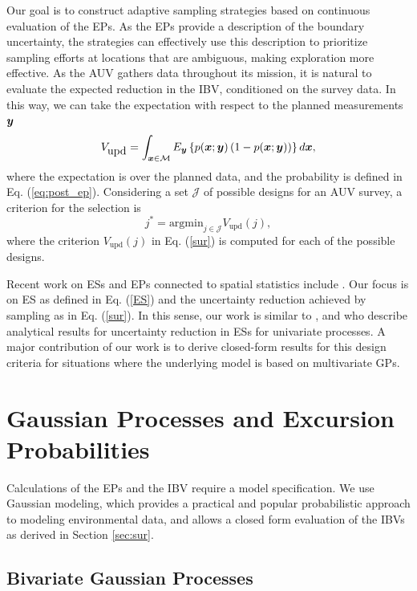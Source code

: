 \documentclass[aoas]{imsart}
\begin{document}
Our goal is to construct adaptive sampling strategies based on continuous evaluation of the EPs. As the EPs provide a description of the boundary uncertainty, the strategies can effectively use this description to prioritize sampling efforts at locations that are ambiguous, making exploration more effective. As the AUV gathers data throughout its mission, it is natural to evaluate the expected reduction in the IBV, conditioned on the survey data. In this way, we can
take the expectation with respect to the planned measurements ${\boldsymbol y}$
\begin{equation}\label{sur}
    V_{\mbox{upd}} = \int_{\bx \in \mathcal{M}} E_{\by} \left\{ p(\bx;\by)\left( 1-p(\bx;\by)\right) \right\} d\bx, 
\end{equation}
where the expectation is over the planned data, and the probability is defined in Eq. (\ref{eq:post_ep}).
Considering a set $\mathcal{J}$ of possible designs for an AUV survey, a criterion for the selection is
\begin{equation}\label{crit}
    j^* = \mbox{argmin}_{j \in \mathcal{J}} V_{\mbox{upd}}(j),
\end{equation}
where the criterion $V_{\mbox{upd}}(j)$ in Eq. (\ref{sur}) is computed
for each of the possible designs. 

Recent work on ESs and EPs connected to spatial statistics include
\cite{picheny2010,french2013spatio,bolin2015excursion,french2016credible}.
Our focus is on ES as defined in Eq. (\ref{ES}) and the uncertainty
reduction achieved by sampling as in Eq. (\ref{sur}). In this sense,
our work is similar to \cite{bect2012}, \cite{chevalier2014fast} and
\cite{azzimonti2016quantifying} who describe analytical results for
uncertainty reduction in ESs for univariate processes. A major
contribution of our work is to derive closed-form results for this
design criteria for situations where the underlying model is based on multivariate GPs.

\section{Gaussian Processes and Excursion Probabilities}
\label{sec:GP_EP}

Calculations of the EPs and the IBV require a model specification. We use Gaussian modeling, which provides a practical and popular probabilistic approach to modeling environmental data, and allows a closed form
evaluation of the IBVs as derived in Section \ref{sec:sur}.

\subsection{Bivariate Gaussian Processes}
\end{document}
